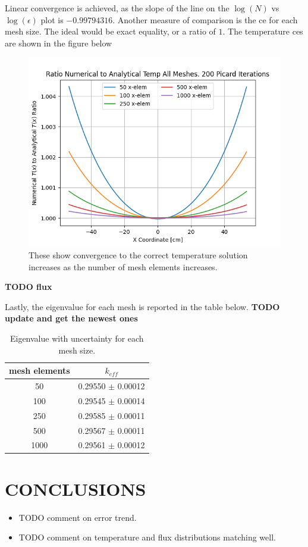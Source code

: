 \documentclass[letterpaper]{mc2023}
\begin{document}
Linear convergence is achieved, as the slope of the line on the $\log(N)$ vs $\log(\epsilon)$ plot is $-0.99794316$. Another
measure of comparison is the \gls{ce} for each mesh size. The ideal would be exact equality, or a ratio of $1$. The temperature
\glspl{ce} are shown in the figure below
\begin{figure}[H]
    \centering
    \includegraphics[width=0.6\linewidth]{figures/temp_num_to_analy_ratios.png}
    \caption{These show convergence to the correct temperature solution increases as the number of mesh elements increases.}
    \label{fig:temp_ce}
\end{figure}

\textbf{TODO flux}

Lastly, the eigenvalue for each mesh is reported in the table below. \textbf{TODO update and get the newest ones}

\begin{table}[H]
    \centering
    \caption{Eigenvalue with uncertainty for each mesh size.}
    \begin{tabular}{c|c}
        \textbf{mesh elements} & $k_{eff}$ \\
        \hline
        50 & 0.29550 $\pm$ 0.00012 \\
        100 & 0.29545 $\pm$ 0.00014 \\
        250 & 0.29585  $\pm$ 0.00011 \\
        500 & 0.29567 $\pm$ 0.00011 \\
        1000 & 0.29561 $\pm$ 0.00012
    \end{tabular}
    \label{tab:data}
\end{table}


\section{CONCLUSIONS}\label{sec:conclusions}

\begin{itemize}
    \item TODO comment on error trend.
    \item TODO comment on temperature and flux distributions matching well.
\end{itemize}
\end{document}

